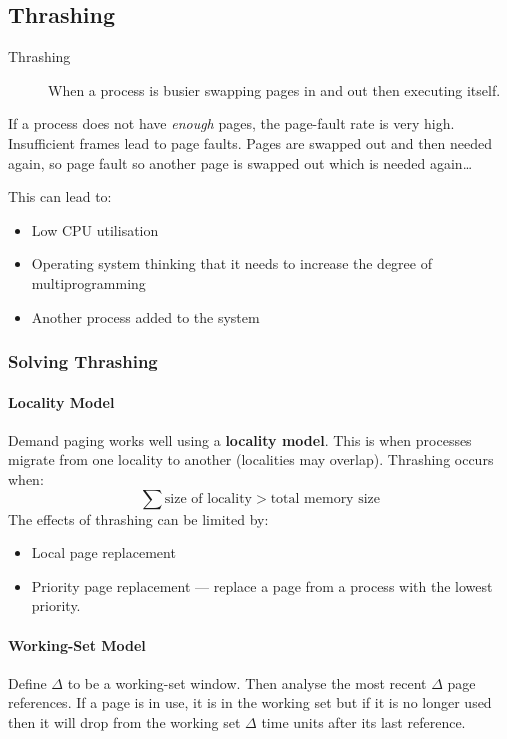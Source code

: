\documentclass{article}%
\begin{document}
\subsection{Thrashing}
\label{sec:orgdfe0501}
\begin{description}
\item[{Thrashing}] When a process is busier swapping pages in and out then executing itself.
\end{description}
If a process does not have \emph{enough} pages, the page-fault rate is very high.
Insufficient frames lead to page faults.
Pages are swapped out and then needed again, so page fault so another page is swapped out which is needed again\ldots{}

This can lead to:
\begin{itemize}
\item Low CPU utilisation
\item Operating system thinking that it needs to increase the degree of multiprogramming
\item Another process added to the system
\end{itemize}

\subsubsection{Solving Thrashing}
\label{sec:org094bfeb}
\paragraph{Locality Model}
\label{sec:orgf97523e}
Demand paging works well using a \textbf{locality model}.
This is when processes migrate from one locality to another (localities may overlap).
Thrashing occurs when:
\begin{equation}
\sum \text{size of locality} > \text{total memory size}
\end{equation}
The effects of thrashing can be limited by:
\begin{itemize}
\item Local page replacement
\item Priority page replacement --- replace a page from a process with the lowest priority.
\end{itemize}

\paragraph{Working-Set Model}
\label{sec:org1b87bdf}
Define \(\Delta\) to be a working-set window.
Then analyse the most recent \(\Delta\) page references.
If a page is in use, it is in the working set but if it is no longer used then it will drop from the working set \(\Delta\) time units after its last reference.
\end{document}
